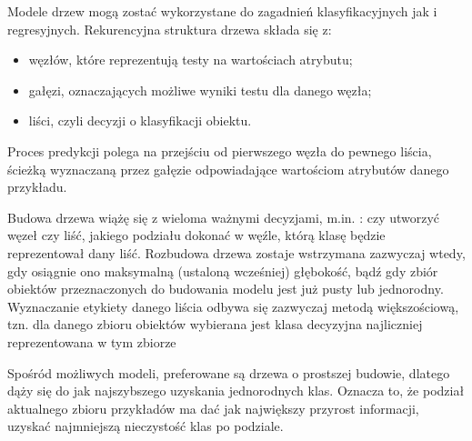 Modele drzew mogą zostać wykorzystane do zagadnień klasyfikacyjnych jak i regresyjnych.
Rekurencyjna struktura drzewa składa się z:
\begin{itemize}
    \item węzłów, które reprezentują testy na wartościach atrybutu;
    \item gałęzi, oznaczających możliwe wyniki testu dla danego węzła;
    \item liści, czyli decyzji o klasyfikacji obiektu.
\end{itemize}
Proces predykcji polega na przejściu od pierwszego węzła do pewnego liścia, ścieżką wyznaczaną przez gałęzie odpowiadające wartościom atrybutów danego przykładu.

Budowa drzewa wiążę się z wieloma ważnymi decyzjami, m.in. : czy utworzyć węzeł czy liść,  jakiego podziału dokonać w węźle, którą klasę będzie reprezentował dany liść. Rozbudowa drzewa zostaje wstrzymana zazwyczaj wtedy, gdy osiągnie ono maksymalną (ustaloną wcześniej) głębokość, bądź gdy zbiór obiektów przeznaczonych do budowania modelu jest już pusty lub jednorodny. Wyznaczanie etykiety danego liścia odbywa się zazwyczaj metodą większościową, tzn.  dla danego zbioru obiektów wybierana jest klasa
decyzyjna najliczniej reprezentowana w tym zbiorze

Spośród możliwych modeli, preferowane są drzewa o prostszej budowie, dlatego dąży się do jak najszybszego uzyskania jednorodnych klas. Oznacza to, że podział aktualnego zbioru przykładów ma dać jak największy przyrost informacji, uzyskać najmniejszą nieczystość
klas po podziale. 
